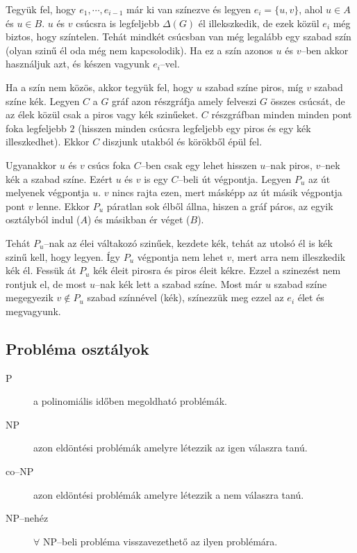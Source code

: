 Tegyük fel, hogy $e_1, \cdots, e_{i-1}$ már ki van színezve és legyen
$e_i=\{u,v\}$, ahol $u \in A$ és $u \in B$. $u$ és $v$ csúcsra is legfeljebb
$\Delta(G)$ él illekszkedik, de ezek közül $e_i$ még biztos, hogy színtelen.
Tehát mindkét csúcsban van még legalább egy szabad szín (olyan szinű él oda még
nem kapcsolodik). Ha ez a szín azonos $u$ és $v$--ben akkor használjuk azt, és
készen vagyunk $e_i$--vel.

Ha a szín nem közös, akkor tegyük fel, hogy $u$ szabad színe piros, míg $v$
szabad színe kék. Legyen $C$ a $G$ gráf azon részgráfja amely felveszi $G$
összes csúcsát, de az élek közül csak a piros vagy kék szinűeket. $C$
részgráfban minden minden pont foka legfeljebb $2$ (hisszen minden csúcsra
legfeljebb egy piros és egy kék illeszkedhet). Ekkor $C$ diszjunk utakból és
körökből épül fel.

Ugyanakkor $u$ és $v$ csúcs foka $C$--ben csak egy lehet hisszen $u$--nak piros,
$v$--nek kék a szabad színe. Ezért $u$ és $v$ is egy $C$--beli út végpontja.
Legyen $P_u$ az út melyenek végpontja $u$. $v$ nincs rajta ezen, mert másképp az
út másik végpontja pont $v$ lenne. Ekkor $P_u$ páratlan sok élből állna, hiszen 
a gráf páros, az egyik osztályból indul ($A$) és másikban ér véget ($B$). 

Tehát $P_u$--nak az élei váltakozó szinűek, kezdete kék, tehát az utolsó él is
kék szinű kell, hogy legyen. Így $P_u$ végpontja nem lehet $v$, mert arra nem
illeszkedik kék él. Fessük át $P_u$ kék éleit pirosra és piros éleit kékre.
Ezzel a szinezést nem rontjuk el, de most $u$--nak kék lett a szabad színe. Most
már $u$ szabad színe megegyezik $v \not \in P_u$ szabad színnével (kék),
színezzük meg ezzel az $e_i$ élet és megvagyunk.

\subsection{Probléma osztályok}
\begin{description}
  \item[P] a polinomiális időben megoldható problémák.
  \item[NP] azon eldöntési problémák amelyre létezzik az igen válaszra tanú.
  \item[co--NP] azon eldöntési problémák amelyre létezzik a nem válaszra tanú.
  \item[NP--nehéz] $\forall$ NP--beli probléma visszavezethető az ilyen problémára.
\end{description}

